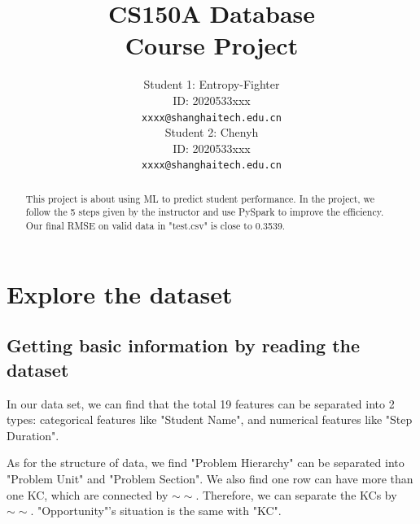\documentclass{article}
\title{CS150A Database \\Course Project}
\author{
  Student 1: Entropy-Fighter\\
  ID: 2020533xxx\\
  \texttt{xxxx@shanghaitech.edu.cn} \\
   \And
  Student 2: Chenyh\\
  ID: 2020533xxx\\
  \texttt{xxxx@shanghaitech.edu.cn}
}
\begin{document}

\maketitle

\begin{abstract}
This project is about using ML to predict student performance. In the project, we follow the 5 steps given by the instructor and use PySpark to improve the efficiency.
Our final RMSE on valid data in "test.csv" is close to 0.3539.
\end{abstract}

\section{Explore the dataset}
\subsection{Getting basic information by reading the dataset}
In our data set, we can find that the total 19 features can be separated into 2 types: categorical features like "Student Name", and numerical features like 
"Step Duration".

As for the structure of data, we find "Problem Hierarchy" can be separated into "Problem Unit" and "Problem
Section". We also find one row can have more than one KC, which are connected by $\sim\sim$. Therefore, we can separate the KCs by $\sim\sim$. "Opportunity"'s situation is the same with "KC".
\end{document}
